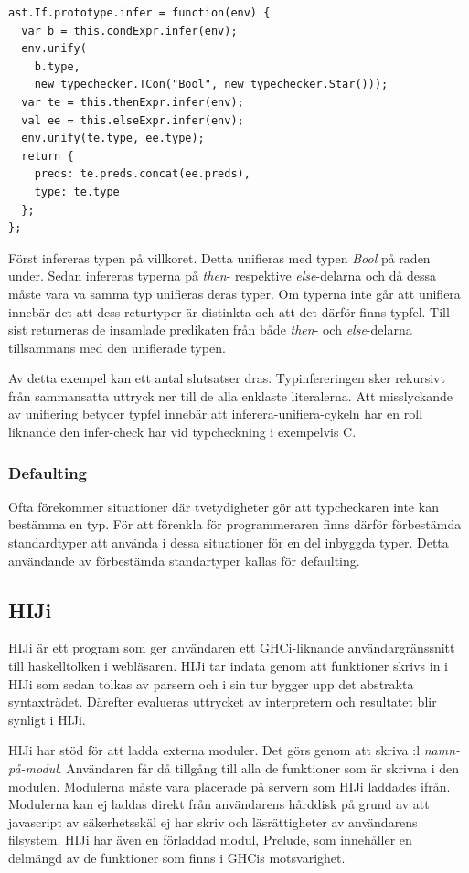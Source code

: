 \begin{lstlisting}
ast.If.prototype.infer = function(env) {
  var b = this.condExpr.infer(env);
  env.unify(
    b.type,
    new typechecker.TCon("Bool", new typechecker.Star()));
  var te = this.thenExpr.infer(env);
  val ee = this.elseExpr.infer(env);
  env.unify(te.type, ee.type);
  return {
    preds: te.preds.concat(ee.preds),
    type: te.type
  };
};
\end{lstlisting}
Först infereras typen på villkoret. Detta unifieras med typen \emph{Bool} på raden under. Sedan infereras typerna på \emph{then}- respektive \emph{else}-delarna och då dessa måste vara va samma typ unifieras deras typer. Om typerna inte går att unifiera innebär det att dess returtyper är distinkta och att det därför finns typfel. Till sist returneras de insamlade predikaten från både \emph{then}- och \emph{else}-delarna tillsammans med den unifierade typen.

Av detta exempel kan ett antal slutsatser dras. Typinfereringen sker rekursivt från sammansatta uttryck ner till de alla enklaste literalerna. Att misslyckande av unifiering betyder typfel innebär att inferera-unifiera-cykeln har en roll liknande den infer-check har vid typcheckning i exempelvis C.

\subsubsection{Defaulting}
Ofta förekommer situationer där tvetydigheter gör att typcheckaren inte kan bestämma en typ. För att förenkla för programmeraren finns därför förbestämda standardtyper att använda i dessa situationer för en del inbyggda typer. Detta användande av förbestämda standartyper kallas för defaulting.

\subsection{HIJi}

HIJi är ett program som ger användaren ett GHCi-liknande användargränssnitt till haskelltolken i webläsaren. 
HIJi tar indata genom att funktioner skrivs in i HIJi som sedan tolkas av parsern och i sin tur bygger upp det abstrakta syntaxträdet. Därefter evalueras uttrycket av interpretern och resultatet blir synligt i HIJi.

HIJi har stöd för att ladda externa moduler. Det görs genom att skriva :l \emph{namn-på-modul}. Användaren får då tillgång till alla de funktioner som är skrivna i den modulen. Modulerna måste vara placerade på servern som HIJi laddades ifrån. Modulerna kan ej laddas direkt från användarens hårddisk på grund av att javascript av säkerhetsskäl ej har skriv och läsrättigheter av användarens filsystem. HIJi har även en förladdad modul, Prelude, som innehåller en delmängd av de funktioner som finns i GHCis motsvarighet. 

